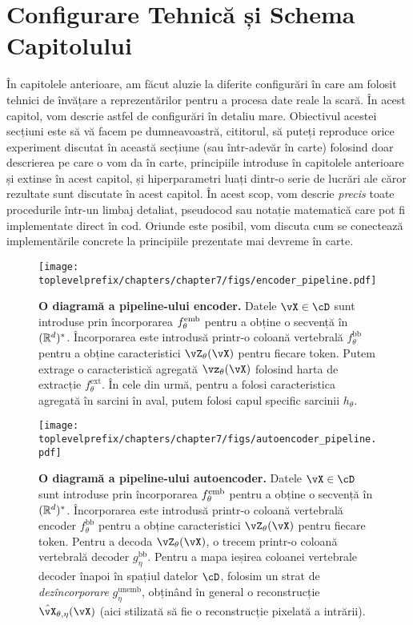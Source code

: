 \documentclass[../../book-main_ro.tex]{subfiles}
\begin{document}
\section{Configurare Tehnică și Schema Capitolului}\label{sec:experiment_setup}

În capitolele anterioare, am făcut aluzie la diferite configurări în care am folosit tehnici de învățare a reprezentărilor pentru a procesa date reale la scară. În acest capitol, vom descrie astfel de configurări în detaliu mare. Obiectivul acestei secțiuni este să vă facem pe dumneavoastră, cititorul, să puteți reproduce orice experiment discutat în această secțiune (sau într-adevăr în carte) folosind doar descrierea pe care o vom da în carte, principiile introduse în capitolele anterioare și extinse în acest capitol, și hiperparametri luați dintr-o serie de lucrări ale căror rezultate sunt discutate în acest capitol. În acest scop, vom descrie \textit{precis} toate procedurile într-un limbaj detaliat, pseudocod sau notație matematică care pot fi implementate direct în cod. Oriunde este posibil, vom discuta cum se conectează implementările concrete la principiile prezentate mai devreme în carte.

\begin{figure}
    \texttt{[image: \\toplevelprefix/chapters/chapter7/figs/encoder\_pipeline.pdf]}
    \caption{\small\textbf{O diagramă a pipeline-ului encoder.} Datele \(\vX \in \cD\) sunt introduse prin încorporarea \(f_{\theta}^{\mathrm{emb}}\) pentru a obține o secvență în \((\mathbb{R}^{d})^{*}\). Încorporarea este introdusă printr-o coloană vertebrală \(f_{\theta}^{\mathrm{bb}}\) pentru a obține caracteristici \(\vZ_{\theta}(\vX)\) pentru fiecare token. Putem extrage o caracteristică agregată \(\vz_{\theta}(\vX)\) folosind harta de extracție \(f_{\theta}^{\mathrm{ext}}\). În cele din urmă, pentru a folosi caracteristica agregată în sarcini în aval, putem folosi capul specific sarcinii \(h_{\theta}\).}
    \label{fig:overall_encoder_pipeline}
\end{figure}

\begin{figure}
    \texttt{[image: \\toplevelprefix/chapters/chapter7/figs/autoencoder\_pipeline.pdf]}
    \caption{\small\textbf{O diagramă a pipeline-ului autoencoder.} Datele \(\vX \in \cD\) sunt introduse prin încorporarea \(f_{\theta}^{\mathrm{emb}}\) pentru a obține o secvență în \((\mathbb{R}^{d})^{*}\). Încorporarea este introdusă printr-o coloană vertebrală encoder \(f_{\theta}^{\mathrm{bb}}\) pentru a obține caracteristici \(\vZ_{\theta}(\vX)\) pentru fiecare token. Pentru a decoda \(\vZ_{\theta}(\vX)\), o trecem printr-o coloană vertebrală decoder \(g_{\eta}^{\mathrm{bb}}\). Pentru a mapa ieșirea coloanei vertebrale decoder înapoi în spațiul datelor \(\cD\), folosim un strat de \textit{dezîncorporare} \(g_{\eta}^{\mathrm{unemb}}\), obținând în general o reconstrucție \(\hat{\vX}_{\theta, \eta}(\vX)\) (aici stilizată să fie o reconstrucție pixelată a intrării).}
    \label{fig:overall_autoencoder_pipeline}
\end{figure}
\end{document}
